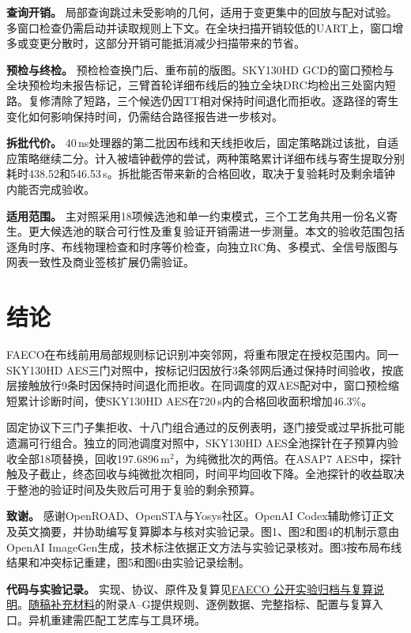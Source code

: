 \documentclass[twocolumn,10pt,fontset=windows]{ctexart}
\begin{document}
\textbf{查询开销。} 局部查询跳过未受影响的几何，适用于变更集中的回放与配对试验。多窗口检查仍需启动并读取规则上下文。在全块扫描开销较低的UART上，窗口增多或变更分散时，这部分开销可能抵消减少扫描带来的节省。

\textbf{预检与终检。} 预检检查换门后、重布前的版图。SKY130HD GCD的窗口预检与全块预检均未报告标记，三臂首轮详细布线后的独立全块DRC均检出三处窗内短路。复修清除了短路，三个候选仍因TT相对保持时间退化而拒收。逐路径的寄生变化如何影响保持时间，仍需结合路径报告进一步核对。

\textbf{拆批代价。} 40\,ns处理器的第二批因布线和天线拒收后，固定策略跳过该批，自适应策略继续二分。计入被墙钟截停的尝试，两种策略累计详细布线与寄生提取分别耗时438.52和546.53\,s。拆批能否带来新的合格回收，取决于复验耗时及剩余墙钟内能否完成验收。

\textbf{适用范围。} 主对照采用18项候选池和单一约束模式，三个工艺角共用一份名义寄生。更大候选池的联合可行性及重复验证开销需进一步测量。本文的验收范围包括逐角时序、布线物理检查和时序等价检查，向独立RC角、多模式、全信号版图与网表一致性及商业签核扩展仍需验证。

\section{结论}

FAECO在布线前用局部规则标记识别冲突邻网，将重布限定在授权范围内。同一SKY130HD AES三门对照中，按标记归因放行3条邻网后通过保持时间验收，按底层接触放行9条时因保持时间退化而拒收。在同调度的双AES配对中，窗口预检缩短累计诊断时间，使SKY130HD AES在720\,s内的合格回收面积增加46.3\%。

固定协议下三门子集拒收、十八门组合通过的反例表明，逐门接受或过早拆批可能遗漏可行组合。独立的同池调度对照中，SKY130HD AES全池探针在子预算内验收全部18项替换，回收197.6896\,\textmu m$^2$，为纯微批次的两倍。在ASAP7 AES中，探针触及子截止，终态回收与纯微批次相同，时间平均回收下降。全池探针的收益取决于整池的验证时间及失败后可用于复验的剩余预算。

\vspace{0.16cm}
\noindent\textbf{致谢。}
感谢OpenROAD、OpenSTA与Yosys社区。OpenAI Codex辅助修订正文及英文摘要，并协助编写复算脚本与核对实验记录。图1、图2和图4的机制示意由OpenAI ImageGen生成，技术标注依据正文方法与实验记录核对。图3按布局布线结果和冲突标记重建，图5和图6由实验记录绘制。

\noindent\textbf{代码与实验记录。}
实现、协议、原件及复算见\href{https://github.com/Toylog123/FAECO/blob/f0fe992b9ce44b8368b620d06b8d95a56179347c/project_docs/evidence/tcad_v5_revision_20261126/REPRODUCIBILITY.md}{FAECO 公开实验归档与复算说明}。\href{https://raw.githubusercontent.com/Toylog123/FAECO/7ac9e86e6d8f1fc4a3003e129432f7b76fdcbe5a/paper/zh/manuscript/FAECO_R7_\%E8\%A1\%A5\%E5\%85\%85\%E6\%9D\%90\%E6\%96\%99.pdf}{随稿补充材料}的附录A--G提供规则、逐例数据、完整指标、配置与复算入口。异机重建需匹配工艺库与工具环境。
\end{document}
